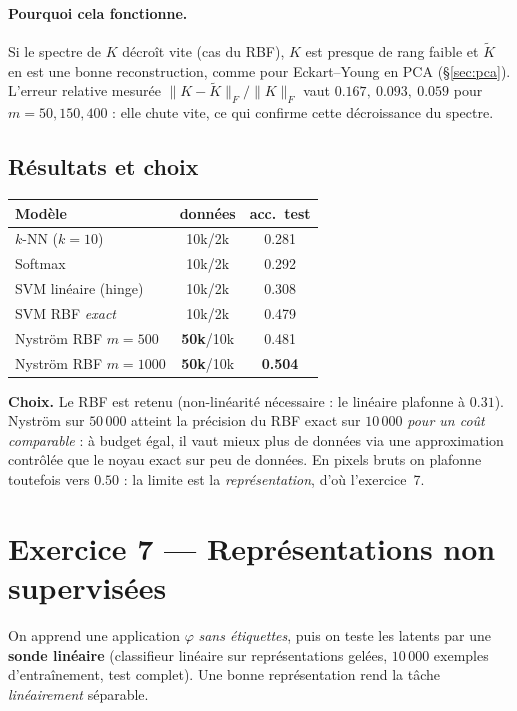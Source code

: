 \documentclass[11pt]{article}
\theoremstyle{remark}
\newcommand{\norm}[1]{\lVert #1 \rVert}
\begin{document}
\paragraph{Pourquoi cela fonctionne.} Si le spectre de $K$ décroît vite (cas du
RBF), $K$ est presque de rang faible et $\tilde K$ en est une bonne
reconstruction, comme pour Eckart–Young en PCA (\S\ref{sec:pca}). L'erreur
relative mesurée $\norm{K-\tilde K}_F/\norm{K}_F$ vaut $0.167,\ 0.093,\ 0.059$
pour $m=50,150,400$ : elle chute vite, ce qui confirme cette décroissance du
spectre.

\subsection{Résultats et choix}
\begin{center}
	\begin{tabular}{lcc}
		\toprule
		Modèle & données & acc.\ test \\
		\midrule
		$k$-NN ($k{=}10$)        & 10k/2k & 0.281 \\
		Softmax                  & 10k/2k & 0.292 \\
		SVM linéaire (hinge)     & 10k/2k & 0.308 \\
		SVM RBF \emph{exact}     & 10k/2k & 0.479 \\
		Nyström RBF $m{=}500$    & \textbf{50k}/10k & 0.481 \\
		Nyström RBF $m{=}1000$   & \textbf{50k}/10k & \textbf{0.504} \\
		\bottomrule
	\end{tabular}
\end{center}
\noindent\textbf{Choix.} Le RBF est retenu (non-linéarité nécessaire : le linéaire
plafonne à $0.31$). Nyström sur $50\,000$ atteint la précision du RBF exact sur
$10\,000$ \emph{pour un coût comparable} : à budget égal, il vaut mieux plus de
données via une approximation contrôlée que le noyau exact sur peu de données. En
pixels bruts on plafonne toutefois vers $0.50$ : la limite est la
\emph{représentation}, d'où l'exercice~7.

\section{Exercice 7 — Représentations non supervisées}
On apprend une application $\varphi$ \emph{sans étiquettes}, puis on teste les
latents par une \textbf{sonde linéaire} (classifieur linéaire sur représentations
gelées, $10\,000$ exemples d'entraînement, test complet). Une bonne représentation
rend la tâche \emph{linéairement} séparable.
\end{document}
